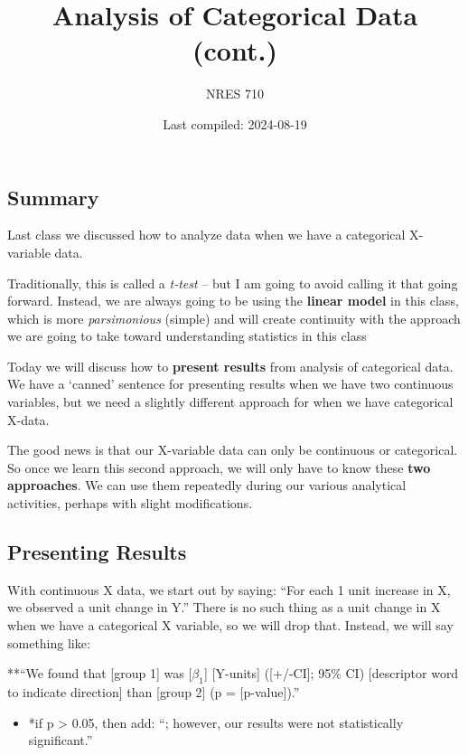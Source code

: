 \documentclass[
]{article}
\title{Analysis of Categorical Data (cont.)}
\author{NRES 710}
\date{Last compiled: 2024-08-19}
\providecommand{\tightlist}{%
  \setlength{\itemsep}{0pt}\setlength{\parskip}{0pt}}
\begin{document}
\maketitle

\subsection{Summary}\label{summary}

Last class we discussed how to analyze data when we have a categorical
X-variable data.

Traditionally, this is called a \emph{t-test} -- but I am going to avoid
calling it that going forward. Instead, we are always going to be using
the \textbf{linear model} in this class, which is more
\emph{parsimonious} (simple) and will create continuity with the
approach we are going to take toward understanding statistics in this
class

Today we will discuss how to \textbf{present results} from analysis of
categorical data. We have a `canned' sentence for presenting results
when we have two continuous variables, but we need a slightly different
approach for when we have categorical X-data.

The good news is that our X-variable data can only be continuous or
categorical. So once we learn this second approach, we will only have to
know these \textbf{two approaches}. We can use them repeatedly during
our various analytical activities, perhaps with slight modifications.

\subsection{Presenting Results}\label{presenting-results}

With continuous X data, we start out by saying: ``For each 1 unit
increase in X, we observed a unit change in Y.'' There is no such thing
as a unit change in X when we have a categorical X variable, so we will
drop that. Instead, we will say something like:

**``We found that {[}group 1{]} was {[}\(\beta_1\){]} {[}Y-units{]}
({[}+/-CI{]}; 95\% CI) {[}descriptor word to indicate direction{]} than
{[}group 2{]} (p = {[}p-value{]}).''

\begin{itemize}
\tightlist
\item
  *if p \textgreater{} 0.05, then add: ``; however, our results were not
  statistically significant.''
\end{itemize}
\end{document}
